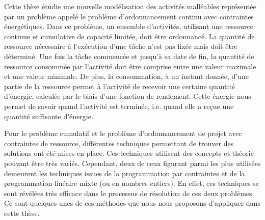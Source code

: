 Cette thèse étudie une nouvelle modélisation des activités malléables
représentée par un problème appelé le problème d'ordonnancement
continu avec contraintes énergétiques. Dans ce problème, un ensemble
d'activités,  utilisant une ressource continue et cumulative de
capacité limitée, doit être ordonnancé. La quantité de ressource
nécessaire à l'exécution d'une tâche n'est pas fixée mais doit
être déterminé. Une fois la tâche commencée et jusqu'à sa date de fin,
la quantité de ressource consommée par l'activité doit être comprise
entre une valeur maximale et une valeur minimale. De plus, la
consommation, à un instant donnée,  d'une partie de la ressource
permet à l'activité de recevoir une certaine quantité d'énergie,
calculée par le biais d'une fonction de rendement. Cette énergie nous
permet de savoir quand l'activité est terminée, i.e. quand elle a
reçue une quantité suffisante d'énergie. 

Pour le problème cumulatif et le problème d'ordonnancement de projet
avec contraintes de ressource, différentes techniques permettant de
trouver des solutions ont été mises en place. Ces techniques utilisent
des concepts et théorie pouvant être très variés. Cependant, deux de
ceux figurant parmi les plus utilisées demeurent les techniques issues
de la programmation par contraintes et de la programmation linéaire
mixte (ou en nombres entiers). En effet, ces techniques se sont
révélées très efficace dans le processus de résolution de ces deux
problèmes. Ce sont quelques unes de ces méthodes que nous nous
proposons d'appliquer dans cette thèse.

